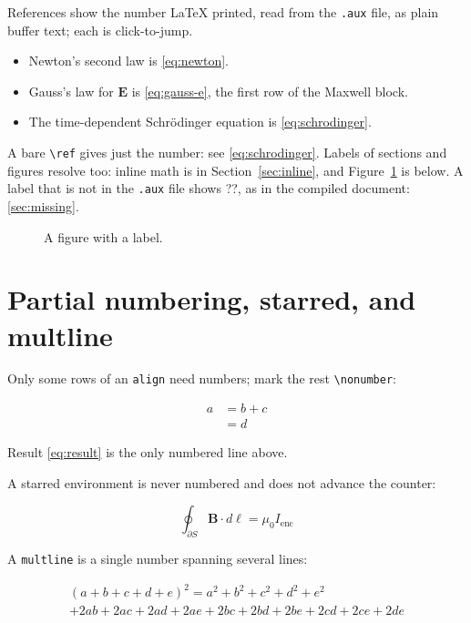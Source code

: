 \documentclass{article}
\begin{document}
References show the number LaTeX printed, read from the \verb|.aux| file, as
plain buffer text; each is click-to-jump.
\begin{itemize}
\item Newton's second law is \eqref{eq:newton}.
\item Gauss's law for $\mathbf{E}$ is \eqref{eq:gauss-e}, the first row of the
  Maxwell block.
\item The time-dependent Schr\"odinger equation is \eqref{eq:schrodinger}.
\end{itemize}

A bare \verb|\ref| gives just the number: see \ref{eq:schrodinger}. Labels of
sections and figures resolve too: inline math is in Section~\ref{sec:inline},
and Figure~\ref{fig:box} is below. A label that is not in the \verb|.aux| file
shows ??, as in the compiled document: \ref{sec:missing}.

\begin{figure}[h]
  \centering
  \caption{A figure with a label.}
  \label{fig:box}
\end{figure}

\section{Partial numbering, starred, and multline}

Only some rows of an \verb|align| need numbers; mark the rest
\verb|\nonumber|:

\begin{align}
a &= b + c \nonumber \\
  &= d \label{eq:result}
\end{align}

Result \eqref{eq:result} is the only numbered line above.

A starred environment is never numbered and does not advance the counter:

\begin{equation*}
\oint_{\partial S} \mathbf{B} \cdot d\boldsymbol{\ell} = \mu_0 I_{\text{enc}}
\end{equation*}

A \verb|multline| is a single number spanning several lines:

\begin{multline}
(a + b + c + d + e)^2 = a^2 + b^2 + c^2 + d^2 + e^2 \\
+ 2ab + 2ac + 2ad + 2ae + 2bc + 2bd + 2be + 2cd + 2ce + 2de
\end{multline}
\end{document}
